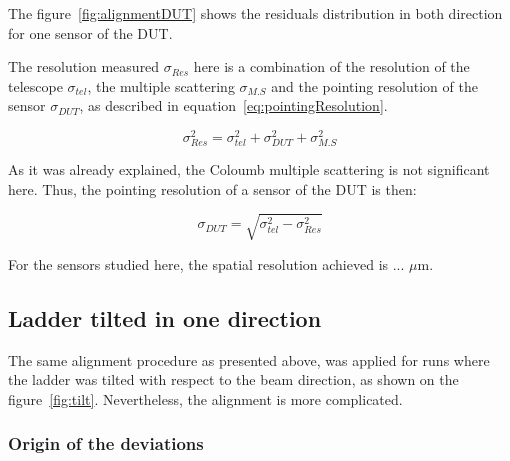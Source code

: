       The figure~\ref{fig:alignmentDUT} shows the residuals distribution in both direction for one sensor of the \gls{DUT}.

      The resolution measured $\sigma_{Res}$ here is a combination of the resolution of the telescope $\sigma_{tel}$, the multiple scattering $\sigma_{M.S}$ and the pointing resolution of the sensor $\sigma_{DUT}$, as described in equation~\ref{eq:pointingResolution}.
      
      \begin{equation}
        \sigma_{Res}^2 = \sigma_{tel}^2 + \sigma_{DUT}^2 + \sigma_{M.S}^2
        \label{eq:pointingResolution}
      \end{equation}

      As it was already explained, the Coloumb multiple scattering is not significant here.
      Thus, the pointing resolution of a sensor of the \gls{DUT} is then:

      \begin{equation}
        \sigma_{DUT} = \sqrt{\sigma_{tel}^2 - \sigma_{Res}^2}
      \end{equation}

      For the sensors studied here, the spatial resolution achieved is ... $\mu\text{m}$.

    \subsection{Ladder tilted in one direction}

      The same alignment procedure as presented above, was applied for runs where the ladder was tilted with respect to the beam direction, as shown on the figure~\ref{fig:tilt}.
      Nevertheless, the alignment is more complicated.
      
      \begin{figure}
      \end{figure}
    
      \subsubsection{Origin of the deviations}

